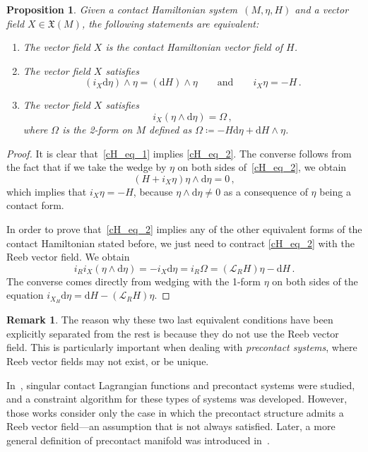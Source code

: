\documentclass[11pt]{article}
\theoremstyle{plain}
\newtheorem{proposition}[theorem]{Proposition}
\theoremstyle{definition}
\newtheorem{remark}[theorem]{Remark}
\renewcommand{\d}{\mathrm{d}}
\newcommand{\Lie}{\mathscr{L}}
\newcommand{\X}{\mathfrak{X}}
\def\d{\mathrm{d}}
\def\X{\mathfrak{X}}
\def\d{\mathrm{d}}
\def\Lie{\mathscr{L}}
\begin{document}
\begin{proposition}
    Given a contact Hamiltonian system~$(M,\eta,H)$ and a vector field $X\in\X(M)$, the following statements are equivalent:
    \begin{enumerate}[(1)]
        \item The vector field $X$ is the contact Hamiltonian vector field of $H$.
		\item The vector field $X$ satisfies
		\begin{equation} \label{cH_eq_1}
				(i_{X} \d \eta) \wedge \eta = (\d H) \wedge \eta 
				\qquad \text{and} \qquad
				i_{X} \eta = -H \,.
		\end{equation}
		
		\item The vector field $X$ satisfies
		\begin{equation}\label{cH_eq_2}
				i_{X} (\eta \wedge \d \eta) = \Omega\,,
		\end{equation}
		where $\Omega$ is the 2-form on $M$ defined as $\Omega \coloneq - H \d \eta + \d H \wedge \eta$.
		\end{enumerate}
\end{proposition}
\begin{proof}
    It is clear that~\eqref{cH_eq_1} implies \eqref{cH_eq_2}. The converse follows from the fact that if we take the wedge by $\eta$ on both sides of~\eqref{cH_eq_2}, we obtain
    $$(H+i_X \eta ) \eta \wedge \d \eta =0\,,$$
    which implies that $i_X \eta = -H$, because $\eta \wedge \d \eta \neq 0$ as a consequence of $\eta$ being a contact form. 
    
    In order to prove that~\eqref{cH_eq_2} implies any of the other equivalent forms of the contact Hamiltonian stated before, we just need to contract \eqref{cH_eq_2} with the Reeb vector field. We obtain
    $$i_R i_X (\eta \wedge \d \eta) = -i_X \d\eta=i_R \Omega = (\Lie_R H)\eta - \d H \,.$$
    The converse comes directly from wedging with the 1-form $\eta$ on both sides of the equation $i_{X_H}\d\eta = \d H - (\Lie_R H)\eta$. 
\end{proof}
\begin{remark}
    The reason why these two last equivalent conditions have been explicitly separated from the rest is because they do not use the Reeb vector field. This is particularly important when dealing with \textsl{precontact systems}, where Reeb vector fields may not exist, or be unique.

    In~\cite{LGGMR_23,LL_19a,Lai_22}, singular contact Lagrangian functions and precontact systems were studied, and a constraint algorithm for these types of systems was developed. However, those works consider only the case in which the precontact structure admits a Reeb vector field—an assumption that is not always satisfied. Later, a more general definition of precontact manifold was introduced in~\cite{GG_23}.
\end{remark}
\end{document}
